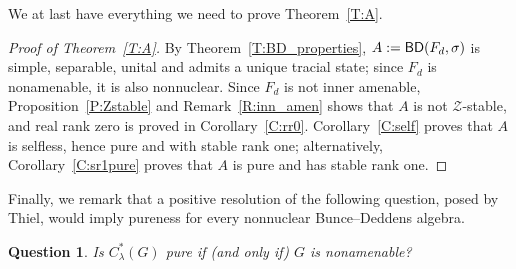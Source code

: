 \documentclass[11pt,a4,leqno]{amsart}
\newtheorem{question}{Question}
\theoremstyle{definition}
\theoremstyle{remark}
\numberwithin{equation}{section}
\theoremstyle{plain}
\newcommand{\BD}{{\sf{BD}}}
\begin{document}
We at last have everything we need to prove Theorem~\ref{T:A}. 

\begin{proof}[Proof of Theorem~\ref{T:A}]
    By Theorem~\ref{T:BD_properties}, $A:=\BD (F_d,\sigma)$ is simple, separable, unital and admits a unique tracial state; since $F_d$ is nonamenable, it is also nonnuclear.  Since $F_d$ is not inner amenable, Proposition~\ref{P:Zstable} and Remark~\ref{R:inn_amen} shows that $A$ is not $\mathcal{Z}$-stable, and real rank zero is proved in Corollary~\ref{C:rr0}. Corollary~\ref{C:self} proves that $A$ is selfless, hence pure and with stable rank one; alternatively, Corollary~\ref{C:sr1pure} proves that $A$ is pure and has stable rank one.
\end{proof}

Finally, we remark that a positive resolution of the following question, posed by Thiel, would imply pureness for every nonnuclear Bunce--Deddens algebra.

\begin{question}
    Is $C^*_\lambda(G)$ pure if (and only if) $G$ is nonamenable?
\end{question}
\end{document}
